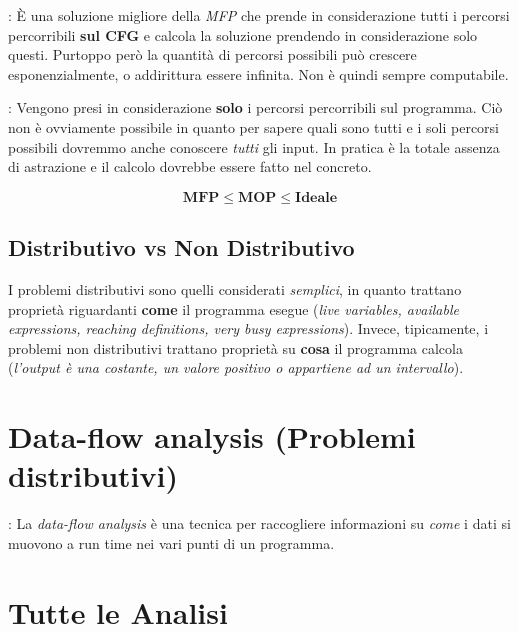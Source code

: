 \documentclass[a4paper,12pt,openany]{article}
\newenvironment{definition}[1][Definizione]{\begin{trivlist}
\item[\hskip \labelsep {\bfseries #1}]}{\end{trivlist}}
\begin{document}
\begin{definition}[MOP (merge over all paths)]:
    È una soluzione migliore della \emph{MFP} che prende in considerazione tutti i percorsi percorribili
    \textbf{sul CFG} e calcola la soluzione prendendo in considerazione solo questi. Purtoppo però
    la quantità di percorsi possibili può crescere esponenzialmente, o addirittura essere infinita. Non è
    quindi sempre computabile.
\end{definition}

\begin{definition}[Ideale]:
    Vengono presi in considerazione \textbf{solo} i percorsi percorribili sul programma. Ciò non è ovviamente
    possibile in quanto per sapere quali sono tutti e i soli percorsi possibili dovremmo anche conoscere
    \emph{tutti} gli input. In pratica è la totale assenza di astrazione e il calcolo dovrebbe essere fatto
    nel concreto.
\end{definition}

$$\mathbf{MFP} \leq \mathbf{MOP} \leq \mathbf{Ideale}$$

\subsection{Distributivo vs Non Distributivo}
I problemi distributivi sono quelli considerati \emph{semplici}, in quanto trattano proprietà riguardanti
\textbf{come} il programma esegue (\emph{live variables, available expressions, reaching definitions, 
very busy expressions}). Invece, tipicamente, i problemi non distributivi trattano proprietà
su \textbf{cosa} il programma calcola (\emph{l'output è una costante, un valore positivo o appartiene ad
un intervallo}).

\section{Data-flow analysis (Problemi distributivi)}
\begin{definition}[Data-flow analysis]:
    La \emph{data-flow analysis} è una tecnica per raccogliere informazioni su \emph{come} i dati si muovono
    a run time nei vari punti di un programma.
\end{definition}


\clearpage
\section{Tutte le Analisi}
\end{document}
